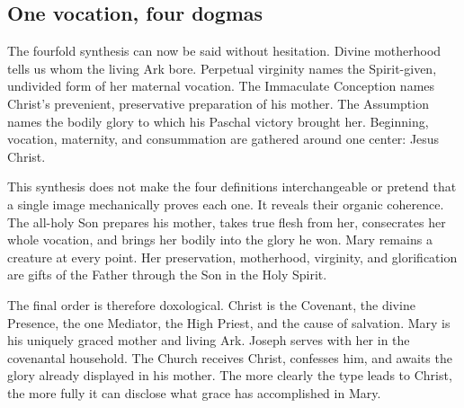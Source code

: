 \subsection{One vocation, four dogmas}

The fourfold synthesis can now be said without hesitation.  Divine motherhood
tells us whom the living Ark bore.  Perpetual virginity names the Spirit-given,
undivided form of her maternal vocation.  The Immaculate Conception names
Christ's prevenient, preservative preparation of his mother.  The Assumption
names the bodily glory to which his Paschal victory brought her.  Beginning,
vocation, maternity, and consummation are gathered around one center: Jesus
Christ.

This synthesis does not make the four definitions interchangeable or pretend
that a single image mechanically proves each one.  It reveals their organic
coherence.  The all-holy Son prepares his mother, takes true flesh from her,
consecrates her whole vocation, and brings her bodily into the glory he won.
Mary remains a creature at every point.  Her preservation, motherhood,
virginity, and glorification are gifts of the Father through the Son in the
Holy Spirit.

The final order is therefore doxological.  Christ is the Covenant, the divine
Presence, the one Mediator, the High Priest, and the cause of salvation.  Mary
is his uniquely graced mother and living Ark.  Joseph serves with her in the
covenantal household.  The Church receives Christ, confesses him, and awaits
the glory already displayed in his mother.  The more clearly the type leads to
Christ, the more fully it can disclose what grace has accomplished in Mary.

